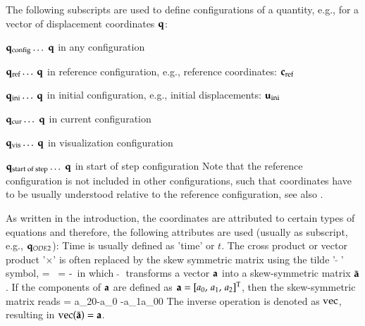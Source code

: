 %
The following subscripts are used to define configurations of a quantity, e.g., for a vector of displacement coordinates $\qv$:
\bi
  \item $\qv\cConfig \ldots$ $\qv$ in any configuration
  \item $\qv\cRef \ldots$ $\qv$ in reference configuration, e.g., reference coordinates: $\cv\cRef$
  \item $\qv\cIni \ldots$ $\qv$ in initial configuration, e.g., initial displacements: $\uv\cIni$
  \item $\qv\cCur \ldots$ $\qv$ in current configuration
  \item $\qv\cVis \ldots$ $\qv$ in visualization configuration
  \item $\qv\cSOS \ldots$ $\qv$ in start of step configuration
\ei
Note that the reference configuration is not included in other configurations, such that coordinates have to be usually understood relative to the reference configuration, see also .

As written in the introduction, the coordinates are attributed to certain types of equations and therefore, the following attributes are used (usually as subscript, e.g., $\qv_{ODE2}$):
Time is usually defined as 'time' or $t$.
The cross product or vector product '$\times$' is often replaced by the skew symmetric matrix using the tilde '$\tilde{\;\;}$' symbol,
\be
  \av \times \bv = \tilde \av \, \bv = -\tilde \bv \, \av \eqComma
\ee
in which $\tilde{\;\;}$ transforms a vector $\av$ into a skew-symmetric matrix $\tilde \av$.
If the components of $\av$ are defined as $\av = \vrRow{a_0}{a_1}{a_2}\tp$, then the skew-symmetric matrix reads
\be
  \tilde \av =  {a_2}{0}{-a_0} {-a_1}{a_0}{0} \eqDot
\ee
The inverse operation is denoted as $\vec$, resulting in $\vec(\tilde \av) = \av$.

